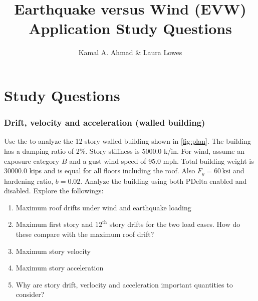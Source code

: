 \documentclass{simcenterdocumentation}
\newcommand{\ksi}{\ensuremath{\,\mathrm{ksi}}}
\begin{document}
\title{Earthquake versus Wind (EVW) Application Study Questions}

\author{Kamal A. Ahmad \& Laura Lowes}

\hypersetup{pageanchor=false}
\maketitle
\copyrightpage
\acknowledgments


%

\graphicspath{{figures/}{}}

\renewcommand{\thesection}{Problem \arabic{section}}
\renewcommand{\thesubsubsection}{Problem \arabic{subsubsection}}
\section*{Study Questions}

\subsubsection{\label{sec:p1}Drift, velocity and acceleration (walled building)} Use the  to analyze the 12-story walled building shown in \cref{fig:plan}. The building has a damping ratio of 2\%. Story stiffness is 5000.0 k/in. For wind, assume an exposure category $B$ and a gust wind speed of 95.0 mph. Total building weight is 30000.0 kips and is equal for all floors including the roof. Also $F_y = 60 \ksi$ and hardening ratio, $b = 0.02$. Analyze the building using both PDelta enabled and disabled. Explore the followings:
\begin{enumerate}[label=\alph*)]
	\item Maximum roof drifts under wind and earthquake loading
	\item Maximum first story and $12^\mathrm{th}$ story drifts
          for the two load cases. How do these compare with the
          maximum roof drift?
	\item Maximum story velocity
	\item Maximum story acceleration
	\item Why are story drift, verlocity and acceleration
          important quantities to consider?
\end{enumerate}
\end{document}
